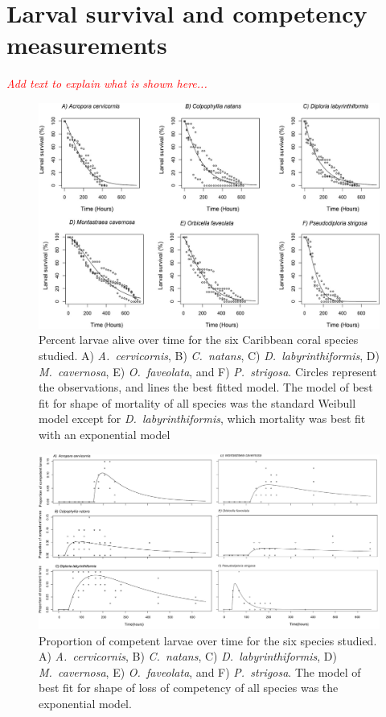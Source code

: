 \documentclass[preprint,12pt,authoryear]{elsarticle}
\newcommand{\emphc}[1]{\emph{\textcolor{red}{#1}}}
\begin{document}
	
	\section{Larval survival and competency measurements}
	\emphc{Add text to explain what is shown here...}
	
	\begin{figure}
		\centering
		\includegraphics[width=\textwidth]{figures/fig_mortality.jpeg}
		\caption{ Percent larvae alive over time for the six Caribbean coral species studied. A) \textit{A.~cervicornis}, B) \textit{C.~natans}, C) \textit{D.~labyrinthiformis}, D) \textit{M.~cavernosa}, E) \textit{O.~faveolata}, and F) \textit{P.~strigosa}. Circles represent the observations, and lines the best fitted model. The model of best fit for shape of mortality of all species was the standard Weibull model except for \textit{D.~labyrinthiformis}, which mortality was best fit with an exponential model}\label{fig:mortality}
	\end{figure}
	\begin{figure}
		\centering
		\includegraphics[width=\textwidth]{figures/fig_competence.png}
		\caption{Proportion of competent larvae over time for the six species studied. A) \textit{A.~cervicornis}, B) \textit{C.~natans}, C) \textit{D.~labyrinthiformis}, D) \textit{M.~cavernosa}, E) \textit{O.~faveolata}, and F) \textit{P.~strigosa}. The model of best fit for shape of loss of competency of all species was the exponential model.}\label{fig:competence}
	\end{figure}
	
\end{document}
